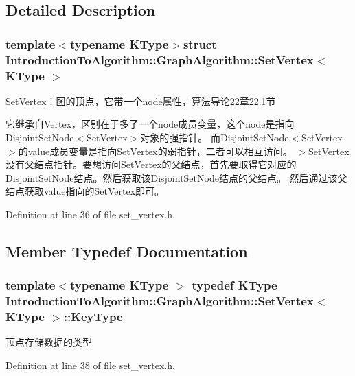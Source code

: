 \subsection{Detailed Description}
\subsubsection*{template$<$typename K\+Type$>$struct Introduction\+To\+Algorithm\+::\+Graph\+Algorithm\+::\+Set\+Vertex$<$ K\+Type $>$}

Set\+Vertex：图的顶点，它带一个node属性，算法导论22章22.1节 

它继承自\+Vertex，区别在于多了一个node成员变量，这个node是指向\+Disjoint\+Set\+Node$<$\+Set\+Vertex$>$对象的强指针。 而\+Disjoint\+Set\+Node$<$\+Set\+Vertex$>$的value成员变量是指向\+Set\+Vertex的弱指针，二者可以相互访问。 $>$Set\+Vertex没有父结点指针。要想访问\+Set\+Vertex的父结点，首先要取得它对应的\+Disjoint\+Set\+Node结点。然后获取该\+Disjoint\+Set\+Node结点的父结点。 然后通过该父结点获取value指向的\+Set\+Vertex即可。 

Definition at line 36 of file set\+\_\+vertex.\+h.



\subsection{Member Typedef Documentation}
\hypertarget{struct_introduction_to_algorithm_1_1_graph_algorithm_1_1_set_vertex_a0cfdcd9af991198be63495f7fb60965d}{}
\subsubsection[{Key\+Type}]{\setlength{\rightskip}{0pt plus 5cm}template$<$typename K\+Type $>$ typedef K\+Type {\bf Introduction\+To\+Algorithm\+::\+Graph\+Algorithm\+::\+Set\+Vertex}$<$ K\+Type $>$\+::{\bf Key\+Type}}\label{struct_introduction_to_algorithm_1_1_graph_algorithm_1_1_set_vertex_a0cfdcd9af991198be63495f7fb60965d}
顶点存储数据的类型 

Definition at line 38 of file set\+\_\+vertex.\+h.

\hypertarget{struct_introduction_to_algorithm_1_1_graph_algorithm_1_1_set_vertex_ae69791a589d95b0f4f378e08b75b041c}{}
